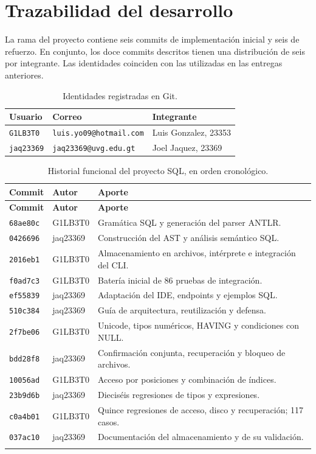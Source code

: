 \documentclass[11pt,a4paper]{article}
\begin{document}
\section{Trazabilidad del desarrollo}

La rama del proyecto contiene seis commits de implementación inicial y
seis de refuerzo. En conjunto, los doce commits descritos tienen una
distribución de seis por integrante. Las identidades coinciden con las
utilizadas en las entregas anteriores.

\begin{table}[H]\centering\small
\begin{tabularx}{\textwidth}{@{}L{2.5cm}L{5.4cm}Y@{}}
\toprule\textbf{Usuario} & \textbf{Correo} & \textbf{Integrante}\\\midrule
\texttt{G1LB3T0} & \texttt{luis.yo09@hotmail.com} & Luis Gonzalez, 23353\\
\texttt{jaq23369} & \texttt{jaq23369@uvg.edu.gt} & Joel Jaquez, 23369\\
\bottomrule
\end{tabularx}
\caption{Identidades registradas en Git.}
\end{table}

\begin{longtable}{@{}L{1.8cm}L{2.3cm}L{10.2cm}@{}}
\toprule\textbf{Commit} & \textbf{Autor} & \textbf{Aporte}\\\midrule\endfirsthead
\toprule\textbf{Commit} & \textbf{Autor} & \textbf{Aporte}\\\midrule\endhead
\texttt{68ae80c} & G1LB3T0 & Gramática SQL y generación del parser ANTLR.\\
\texttt{0426696} & jaq23369 & Construcción del AST y análisis semántico SQL.\\
\texttt{2016eb1} & G1LB3T0 & Almacenamiento en archivos, intérprete e integración del CLI.\\
\texttt{f0ad7c3} & G1LB3T0 & Batería inicial de 86 pruebas de integración.\\
\texttt{ef55839} & jaq23369 & Adaptación del IDE, endpoints y ejemplos SQL.\\
\texttt{510c384} & jaq23369 & Guía de arquitectura, reutilización y defensa.\\
\texttt{2f7be06} & G1LB3T0 & Unicode, tipos numéricos, HAVING y condiciones con NULL.\\
\texttt{bdd28f8} & jaq23369 & Confirmación conjunta, recuperación y bloqueo de archivos.\\
\texttt{10056ad} & G1LB3T0 & Acceso por posiciones y combinación de índices.\\
\texttt{23b9d6b} & jaq23369 & Dieciséis regresiones de tipos y expresiones.\\
\texttt{c0a4b01} & G1LB3T0 & Quince regresiones de acceso, disco y recuperación; 117 casos.\\
\texttt{037ac10} & jaq23369 & Documentación del almacenamiento y de su validación.\\
\bottomrule
\caption{Historial funcional del proyecto SQL, en orden cronológico.}
\end{longtable}
\end{document}
